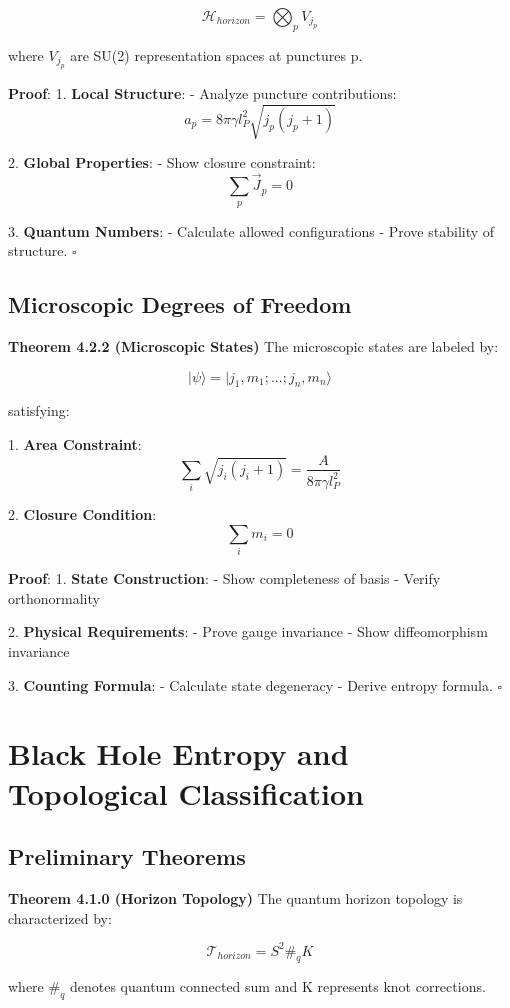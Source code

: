 \documentclass[12pt,a4paper]{article}
\begin{document}
\[
\mathcal{H}_{horizon} = \bigotimes_{p} V_{j_p}
\]

where $V_{j_p}$ are SU(2) representation spaces at punctures p.

\textbf{Proof}:
1. \textbf{Local Structure}:
   - Analyze puncture contributions:
     \[
     a_p = 8\pi\gamma l_P^2\sqrt{j_p(j_p+1)}
     \]

2. \textbf{Global Properties}:
   - Show closure constraint:
     \[
     \sum_p \vec{J}_p = 0
     \]

3. \textbf{Quantum Numbers}:
   - Calculate allowed configurations
   - Prove stability of structure. $\square$

\subsection{Microscopic Degrees of Freedom}

\textbf{Theorem 4.2.2 (Microscopic States)}
The microscopic states are labeled by:

\[
|\psi\rangle = |j_1,m_1;...;j_n,m_n\rangle
\]

satisfying:

1. \textbf{Area Constraint}:
   \[
   \sum_i \sqrt{j_i(j_i+1)} = \frac{A}{8\pi\gamma l_P^2}
   \]

2. \textbf{Closure Condition}:
   \[
   \sum_i m_i = 0
   \]

\textbf{Proof}:
1. \textbf{State Construction}:
   - Show completeness of basis
   - Verify orthonormality

2. \textbf{Physical Requirements}:
   - Prove gauge invariance
   - Show diffeomorphism invariance

3. \textbf{Counting Formula}:
   - Calculate state degeneracy
   - Derive entropy formula. $\square$

\section{Black Hole Entropy and Topological Classification}
\subsection{Preliminary Theorems}

\textbf{Theorem 4.1.0 (Horizon Topology)}
The quantum horizon topology is characterized by:

\[
\mathcal{T}_{horizon} = S^2 \#_q K
\]

where $\#_q$ denotes quantum connected sum and K represents knot corrections.
\end{document}
